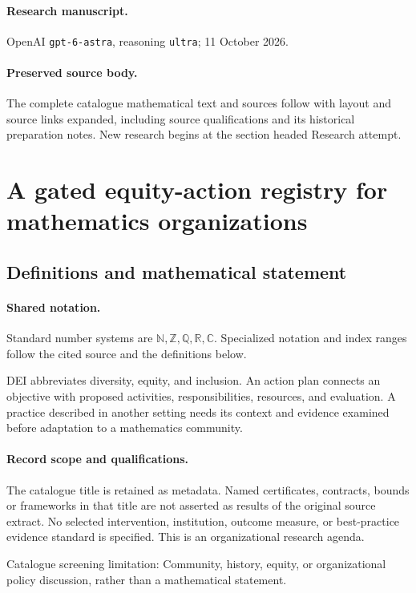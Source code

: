 \documentclass[11pt]{article}
\begin{document}
\paragraph{Research manuscript.} OpenAI \texttt{gpt-6-astra}, reasoning \texttt{ultra}; 11 October 2026.
\paragraph{Preserved source body.} The complete catalogue mathematical text and sources follow with layout and source links expanded, including source qualifications and its historical preparation notes. New research begins at the section headed Research attempt.

\section{A gated equity-action registry for mathematics organizations}\label{statement}

\subsection{Definitions and mathematical statement}

\paragraph{Shared notation.}Standard number systems are $\mathbb N,\mathbb Z,\mathbb Q,\mathbb R,\mathbb C$. Specialized notation and index ranges follow the cited source and the definitions below.


DEI abbreviates diversity, equity, and inclusion. An action plan connects an objective with proposed activities, responsibilities, resources, and evaluation. A practice described in another setting needs its context and evidence examined before adaptation to a mathematics community.
\paragraph{Record scope and qualifications.}
The catalogue title is retained as metadata. Named certificates, contracts, bounds or frameworks in that title are not asserted as results of the original source extract.
No selected intervention, institution, outcome measure, or best-practice evidence standard is specified. This is an organizational research agenda.

Catalogue screening limitation: Community, history, equity, or organizational policy discussion, rather than a mathematical statement.
\end{document}
